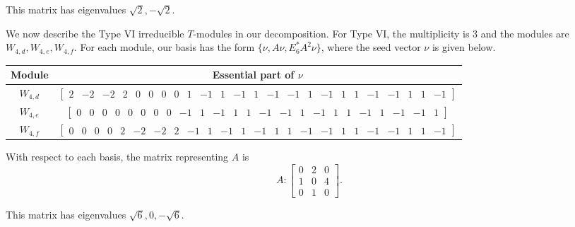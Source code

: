 \documentclass[12pt,letterpaper]{article}
\newcommand{\rowvector}[1]{\begin{bmatrix} #1 \end{bmatrix}}
\begin{document}
This matrix has eigenvalues $\sqrt{2}, -\sqrt{2}$.

We now describe the Type VI irreducible $T$-modules in our decomposition. For Type VI, the multiplicity is 3 and the modules are $W_{4,d},W_{4,e},W_{4,f}$. For each module, our basis has the form $\{\nu, A\nu, E_6^*A^2\nu\}$,
where the seed vector $\nu$ is given below.
\begin{center}
\setlength{\arraycolsep}{3pt}
    \begin{tabular}{c | c}
    \toprule
       \textbf{Module}  & \textbf {Essential part of }$\nu$ \\
       \midrule
       $W_{4,d}$  & $\rowvector{2 & -2 & -2 & 2 & 0 & 0 & 0 & 0 & 1 & -1 & 1 & -1 & 1 & -1 & -1 & 1 & -1 & 1 & 1 & -1 & -1 & 1 & 1 & -1}$ \\[1.67pt]
       $W_{4,e}$  & $\rowvector{0 & 0 & 0 & 0 & 0 & 0 & 0 & 0 & -1 & 1 & -1 & 1 & 1 & -1 & -1 & 1 & -1 & 1 & 1 & -1 & 1 & -1 & -1 & 1}$ \\[1.67pt]
       $W_{4,f}$  & $\rowvector{0 & 0 & 0 & 0 & 2 & -2 & -2 & 2 & -1 & 1 & -1 & 1 & -1 & 1 & 1 & -1 & -1 & 1 & 1 & -1 & -1 & 1 & 1 & -1}$ \\
    \bottomrule
    \end{tabular}
\end{center}

With respect to each basis, the matrix representing $A$ is 
\begin{equation}
    A: \begin{bmatrix}
  0 & 2 & 0 \\
  1 & 0 & 4 \\
  0 & 1 & 0 \end{bmatrix}.
\label{eq:t12-VI}
\end{equation}

This matrix has eigenvalues $\sqrt{6}, 0, -\sqrt{6}$.
\end{document}
